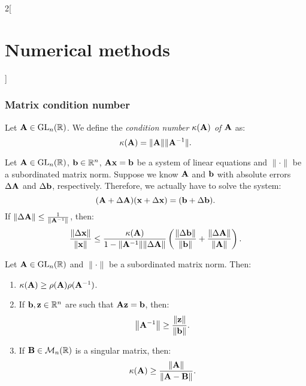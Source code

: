 \documentclass[../../../main.tex]{subfiles}
\begin{document}
\begin{multicols}{2}[\section{Numerical methods}]
\subsubsection*{Matrix condition number}
\begin{definition}
    Let $\vb{A}\in\mathrm{GL}_n(\mathbb{R})$. We define the \textit{condition number $\kappa(\vb{A})$ of $\vb{A}$} as: $$\kappa(\vb{A})=\|\vb{A}\|\|\vb{A}^{-1}\|.$$
\end{definition}
\begin{theorem}
    Let $\vb{A}\in\mathrm{GL}_n(\mathbb{R})$, $\vb{b}\in\mathbb{R}^n$, $\vb{A}\vb{x}=\vb{b}$ be a system of linear equations and $\|\cdot\|$ be a subordinated matrix norm. Suppose we know $\vb{A}$ and $\vb{b}$ with absolute errors $\Delta\vb{A}$ and $\Delta\vb{b}$, respectively. Therefore, we actually have to solve the system: $$(\vb{A}+\Delta\vb{A})(\vb{x}+\Delta \vb{x})=(\vb{b}+\Delta\vb{b}).$$ If $\|\Delta\vb{A}\|\leq\frac{1}{\|\vb{A}^{-1}\|}$, then: $$\frac{\|\Delta \vb{x}\|}{\|\vb{x}\|}\leq\frac{\kappa(\vb{A})}{1-\norm{\vb{A}^{-1}}\norm{\Delta\vb{A}}}\left(\frac{\norm{\Delta\vb{b}}}{\norm{\vb{b}}}+\frac{\norm{\Delta\vb{A}}}{\norm{\vb{A}}}\right).$$
\end{theorem}
\begin{theorem}
    Let $\vb{A}\in\mathrm{GL}_n(\mathbb{R})$ and $\|\cdot\|$ be a subordinated matrix norm. Then:
    \begin{enumerate}
        \item $\kappa(\vb{A})\geq\rho(\vb{A})\rho(\vb{A}^{-1})$.
        \item If $\vb{b},\vb{z}\in\mathbb{R}^n$ are such that $\vb{A}\vb{z}=\vb{b}$, then: $$\norm{\vb{A}^{-1}}\geq\frac{\norm{\vb{z}}}{\norm{\vb{b}}}.$$
        \item If $\vb{B}\in\mathcal{M}_n(\mathbb{R})$ is a singular matrix, then: $$\kappa(\vb{A})\geq\frac{\norm{\vb{A}}}{\norm{\vb{A}-\vb{B}}}.$$
    \end{enumerate}
\end{theorem}

\end{multicols}
\end{document}
